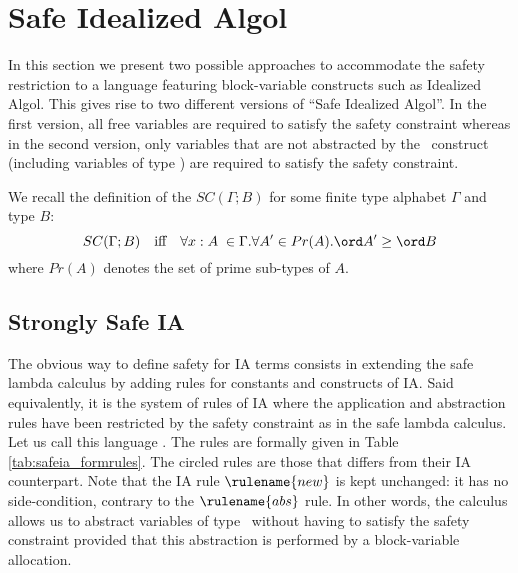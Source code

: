 \section{Safe Idealized Algol}

In this section we present two possible approaches to accommodate
the safety restriction to a language featuring block-variable constructs such as Idealized Algol. This gives rise to two
different versions of ``Safe Idealized Algol''. In the first
version, all free variables are required to satisfy the safety
constraint whereas in the second version, only variables that are
not abstracted by the \ianew\ construct (including variables of type
\iavar) are required to satisfy the safety constraint.

We recall the definition of the  $SC(\Gamma ; B)$
for some finite type alphabet $\Gamma$ and type $B$:
$$SC(\Gamma ; B) \quad \mbox{iff} \quad  \forall x:A\; \in \Gamma . \forall A' \in Pr(A) . \ord A' \geq \ord B$$
where $Pr(A)$ denotes the set of prime sub-types of $A$.



\subsection{Strongly Safe IA}

 The obvious way to define safety for IA terms consists in extending the safe lambda calculus by adding rules
 for constants and constructs of IA.
Said equivalently, it is the system of rules of IA where the
application and abstraction rules  have been restricted by the
safety constraint as in the safe lambda calculus. Let us call this
language . The rules are formally given in
Table \ref{tab:safeia_formrules}. The circled rules are those that
differs from their IA counterpart. Note that the IA rule $\rulename{new}$ is kept unchanged: it has no side-condition, contrary to the $\rulename{abs}$ rule. In other words, the calculus allows us to abstract variables of type \iavar\ without having to satisfy the safety constraint provided that this abstraction is performed by a block-variable allocation.


